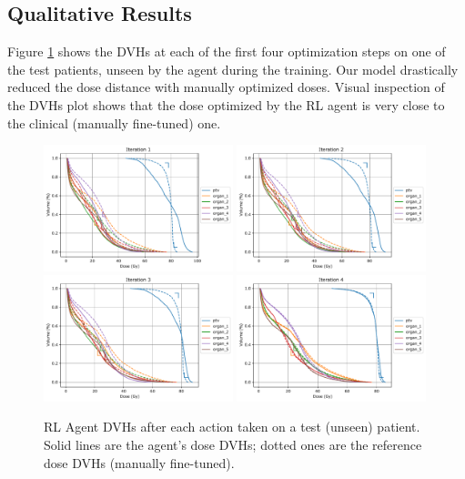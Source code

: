 \subsection{Qualitative Results}
Figure \ref{fig:steps} shows the DVHs at each of the first four optimization steps on one of the test patients, unseen by the agent during the training.
Our model drastically reduced the dose distance with manually optimized doses.
Visual inspection of the DVHs plot shows that the dose optimized by the RL agent is very close to the clinical (manually fine-tuned) one.

\begin{figure}
	\centering
	\includegraphics[width=0.49\textwidth]{steps/distance-test-w1.pdf}	\includegraphics[width=0.49\textwidth]{steps/distance-test-w2.pdf}	\includegraphics[width=0.49\textwidth]{steps/distance-test-w3.pdf}	\includegraphics[width=0.49\textwidth]{steps/distance-test-w4.pdf}
	\caption{RL Agent DVHs after each action taken on a test (unseen) patient. Solid lines are the agent's dose DVHs; dotted ones are the reference dose DVHs (manually fine-tuned).}
	\label{fig:steps}
\end{figure}

